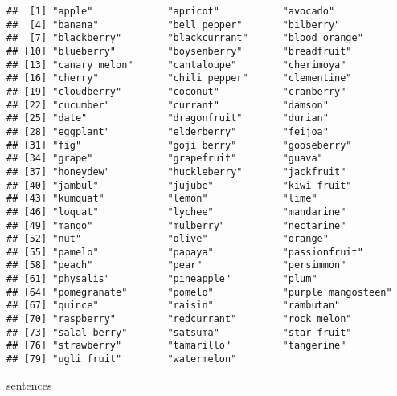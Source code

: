 \documentclass[
]{article}
\newenvironment{Shaded}{\begin{snugshade}}{\end{snugshade}}
\newcommand{\NormalTok}[1]{#1}
\begin{document}
\begin{verbatim}
##  [1] "apple"             "apricot"           "avocado"          
##  [4] "banana"            "bell pepper"       "bilberry"         
##  [7] "blackberry"        "blackcurrant"      "blood orange"     
## [10] "blueberry"         "boysenberry"       "breadfruit"       
## [13] "canary melon"      "cantaloupe"        "cherimoya"        
## [16] "cherry"            "chili pepper"      "clementine"       
## [19] "cloudberry"        "coconut"           "cranberry"        
## [22] "cucumber"          "currant"           "damson"           
## [25] "date"              "dragonfruit"       "durian"           
## [28] "eggplant"          "elderberry"        "feijoa"           
## [31] "fig"               "goji berry"        "gooseberry"       
## [34] "grape"             "grapefruit"        "guava"            
## [37] "honeydew"          "huckleberry"       "jackfruit"        
## [40] "jambul"            "jujube"            "kiwi fruit"       
## [43] "kumquat"           "lemon"             "lime"             
## [46] "loquat"            "lychee"            "mandarine"        
## [49] "mango"             "mulberry"          "nectarine"        
## [52] "nut"               "olive"             "orange"           
## [55] "pamelo"            "papaya"            "passionfruit"     
## [58] "peach"             "pear"              "persimmon"        
## [61] "physalis"          "pineapple"         "plum"             
## [64] "pomegranate"       "pomelo"            "purple mangosteen"
## [67] "quince"            "raisin"            "rambutan"         
## [70] "raspberry"         "redcurrant"        "rock melon"       
## [73] "salal berry"       "satsuma"           "star fruit"       
## [76] "strawberry"        "tamarillo"         "tangerine"        
## [79] "ugli fruit"        "watermelon"
\end{verbatim}

\begin{Shaded}
\begin{Highlighting}[]
\NormalTok{sentences}
\end{Highlighting}
\end{Shaded}
\end{document}
